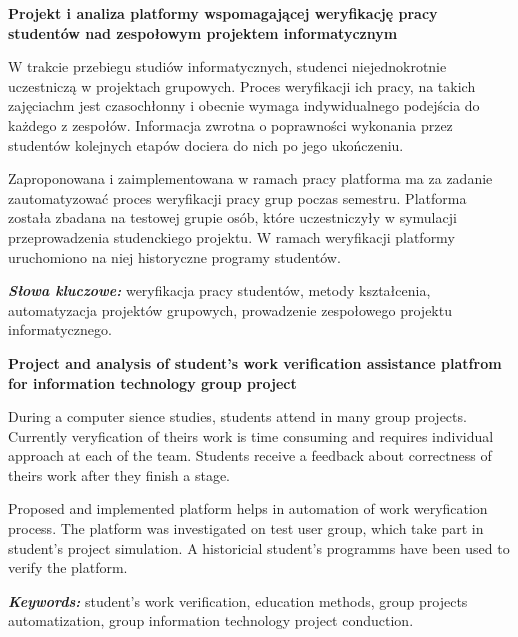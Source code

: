 \newpage
\vspace{10cm}

\newpage
\begin{center}
	\textbf{Projekt i analiza platformy wspomagającej weryfikację pracy studentów
nad zespołowym projektem informatycznym}
\end{center}

W trakcie przebiegu studiów informatycznych, studenci niejednokrotnie uczestniczą w projektach grupowych.
Proces weryfikacji ich pracy, na takich zajęciachm jest czasochłonny i obecnie wymaga indywidualnego podejścia do każdego z zespołów.
Informacja zwrotna o poprawności wykonania przez studentów kolejnych etapów dociera do nich po jego ukończeniu.

Zaproponowana i zaimplementowana w ramach pracy platforma ma za zadanie zautomatyzować proces weryfikacji pracy grup poczas semestru. 
Platforma została zbadana na testowej grupie osób, które uczestniczyły w symulacji przeprowadzenia studenckiego projektu.
W ramach weryfikacji platformy uruchomiono na niej historyczne programy studentów.


\textit{\textbf{Słowa kluczowe:}} weryfikacja pracy studentów, metody kształcenia, automatyzacja projektów grupowych, prowadzenie zespołowego projektu informatycznego.

	\vspace{1cm}

\begin{center}
    \textbf{Project and analysis of student's work verification assistance platfrom for information technology group project}
\end{center}

During a computer sience studies, students attend in many group projects.
Currently veryfication of theirs work is time consuming and requires individual approach at each of the team.
Students receive a feedback about correctness of theirs work after they finish a stage.

Proposed and implemented platform helps in automation of work weryfication process.
The platform was investigated on test user group, which take part in student's project simulation.
A historicial student's programms have been used to verify the platform.

\textit{\textbf{Keywords:}} student's work verification, education methods, group projects automatization, group information technology project conduction.

\cleardoublepage
